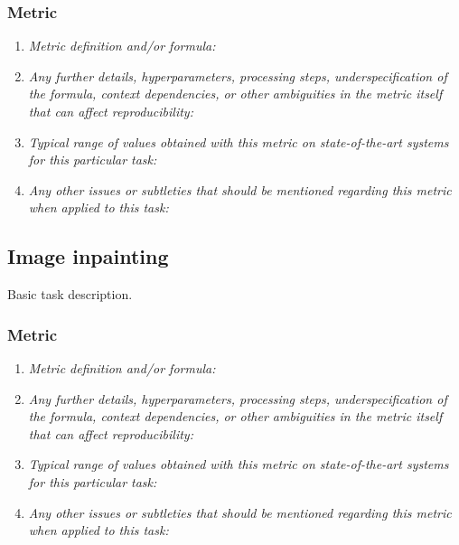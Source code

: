 \documentclass[a4paper,11pt]{article}
\begin{document}
        \subsubsection{Metric}
            \begin{enumerate}[label=\alph*.]
                \item \textit{Metric definition and/or formula:}
                \bigskip
                \item \textit{Any further details, hyperparameters, processing steps, underspecification of the formula, context dependencies, or other ambiguities in the metric itself that can affect reproducibility:}
                \bigskip
                \item \textit{Typical range of values obtained with this metric on state-of-the-art systems for this particular task:}
                \bigskip
                \item \textit{Any other issues or subtleties that should be mentioned regarding this metric when applied to this task:}
                \bigskip
            \end{enumerate}

    \subsection{Image inpainting} \label{image_inpainting}
        Basic task description.
        \subsubsection{Metric}
            \begin{enumerate}[label=\alph*.]
                \item \textit{Metric definition and/or formula:}
                \bigskip
                \item \textit{Any further details, hyperparameters, processing steps, underspecification of the formula, context dependencies, or other ambiguities in the metric itself that can affect reproducibility:}
                \bigskip
                \item \textit{Typical range of values obtained with this metric on state-of-the-art systems for this particular task:}
                \bigskip
                \item \textit{Any other issues or subtleties that should be mentioned regarding this metric when applied to this task:}
                \bigskip
            \end{enumerate}
\end{document}
